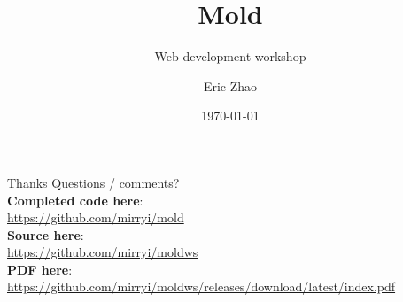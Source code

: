 \documentclass[xcolor={dvipsnames},xtable]{beamer}
\title{Mold}
\subtitle{Web development workshop}
\date{\today}
\author{Eric Zhao}
\begin{document}

\newcommand{\sectiontitle}{}
\newcommand{\currenttitle}{}

\maketitle

\newcommand{\subdir}{sections}
\newcommand{\emojisubdir}{emojisub}
\newcommand{\templatedir}{template}


\renewcommand{\currenttitle}{Thanks}
\begin{frame}{\currenttitle}
  Questions / comments? \\[3em]

  \textbf{Completed code here}: \\
  {\scriptsize \url{https://github.com/mirryi/mold}} \\[1em]

  \textbf{Source here}: \\
  {\scriptsize \url{https://github.com/mirryi/moldws}} \\[1em]

  \textbf{PDF here}: \\
  {\scriptsize \url{https://github.com/mirryi/moldws/releases/download/latest/index.pdf}}
\end{frame}
\end{document}
